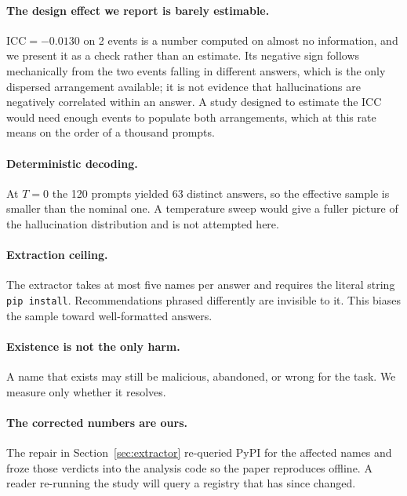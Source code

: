 \documentclass[journal]{IEEEtran}
\theoremstyle{definition}
\newcommand{\Nprompts}{120}
\newcommand{\Ndistinctout}{63}
\newcommand{\Nhall}{2}
\newcommand{\UIcc}{-0.0130}
\begin{document}
\paragraph{The design effect we report is barely estimable.} $\mathrm{ICC} =
\UIcc$ on \Nhall{} events is a number computed on almost no information, and we
present it as a check rather than an estimate. Its negative sign follows
mechanically from the two events falling in different answers, which is the
only dispersed arrangement available; it is not evidence that hallucinations are
negatively correlated within an answer. A study designed to estimate the ICC
would need enough events to populate both arrangements, which at this rate means
on the order of a thousand prompts.

\paragraph{Deterministic decoding.} At $T=0$ the \Nprompts{} prompts yielded
\Ndistinctout{} distinct answers, so the effective sample is smaller than the
nominal one. A temperature sweep would give a fuller picture of the
hallucination distribution and is not attempted here.

\paragraph{Extraction ceiling.} The extractor takes at most five names per
answer and requires the literal string \texttt{pip install}. Recommendations
phrased differently are invisible to it. This biases the sample toward
well-formatted answers.

\paragraph{Existence is not the only harm.} A name that exists may still be
malicious, abandoned, or wrong for the task. We measure only whether it
resolves.

\paragraph{The corrected numbers are ours.} The repair in
Section~\ref{sec:extractor} re-queried PyPI for the affected names and froze
those verdicts into the analysis code so the paper reproduces offline. A reader
re-running the study will query a registry that has since changed.

\end{document}
